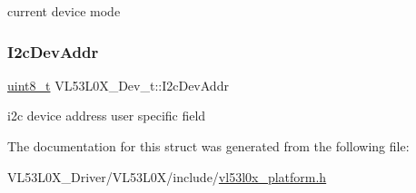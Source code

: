 current device mode \mbox{\label{structVL53L0X__Dev__t_add69f3fe32d5d1fc063133763a282e2c}} 
\subsubsection{\texorpdfstring{I2c\+Dev\+Addr}{I2cDevAddr}}
{\footnotesize\ttfamily \hyperlink{vl53l0x__types_8h_aba7bc1797add20fe3efdf37ced1182c5}{uint8\+\_\+t} V\+L53\+L0\+X\+\_\+\+Dev\+\_\+t\+::\+I2c\+Dev\+Addr}

i2c device address user specific field 

The documentation for this struct was generated from the following file\+:\begin{DoxyCompactItemize}
\item 
V\+L53\+L0\+X\+\_\+\+Driver/\+V\+L53\+L0\+X/include/\hyperlink{vl53l0x__platform_8h}{vl53l0x\+\_\+platform.\+h}\end{DoxyCompactItemize}
